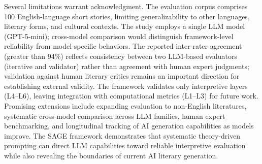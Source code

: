 Several limitations warrant acknowledgment. The evaluation corpus comprises 100 English-language short stories, limiting generalizability to other languages, literary forms, and cultural contexts. The study employs a single LLM model (GPT-5-mini); cross-model comparison would distinguish framework-level reliability from model-specific behaviors. The reported inter-rater agreement (greater than 94\%) reflects consistency between two LLM-based evaluators (iterative and validator) rather than agreement with human expert judgments; validation against human literary critics remains an important direction for establishing external validity. The framework validates only interpretive layers (L4--L6), leaving integration with computational metrics (L1--L3) for future work. Promising extensions include expanding evaluation to non-English literatures, systematic cross-model comparison across LLM families, human expert benchmarking, and longitudinal tracking of AI generation capabilities as models improve. The SAGE framework demonstrates that systematic theory-driven prompting can direct LLM capabilities toward reliable interpretive evaluation while also revealing the boundaries of current AI literary generation.
